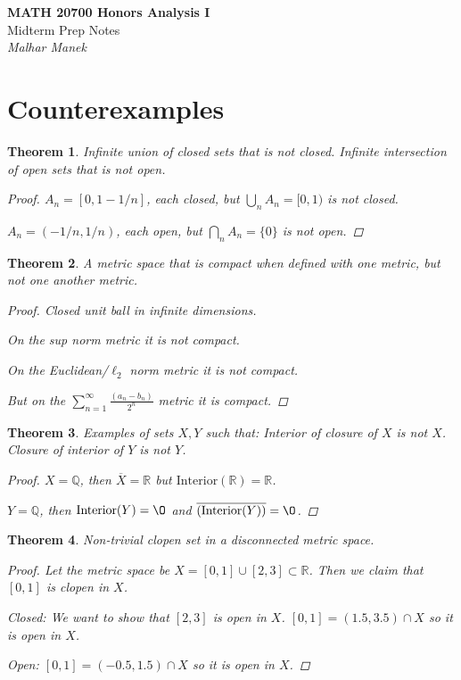\documentclass[11pt]{article}
\newcommand{\bbQ}{\mathbb{Q}}
\newcommand{\bbR}{\mathbb{R}}
\renewcommand{\emptyset}{\O}
\renewcommand{\_}[1]{\underline{ #1 }}
\newtheorem{theorem}{Theorem}[section]
\theoremstyle{definition}
\numberwithin{equation}{subsection}
\begin{document}
\begin{center}
    {\LARGE\bfseries MATH 20700 Honors Analysis I}\\[6pt]
    {\Large Midterm Prep Notes}\\[6pt]
    {\Large\itshape Malhar Manek}
\end{center}

\bigskip

\section*{Counterexamples}
\begin{theorem}
    Infinite union of closed sets that is not closed. Infinite intersection of open sets that is not open. 
    \begin{proof}
        $A_n = [0, 1 - 1/n]$, each closed, but $\bigcup_n A_n = [0,1)$ is not closed.

        $A_n = (-1/n, 1/n)$, each open, but $\bigcap_n A_n = \{0\}$ is not open.
    \end{proof}
\end{theorem}

\begin{theorem}
    A metric space that is compact when defined with one metric, but not one another metric.
    \begin{proof}
        Closed unit ball in infinite dimensions. 

        On the sup norm metric it is not compact.

        On the Euclidean/$\ell_2$ norm metric it is not compact.

        But on the $\sum_{n=1}^\infty \frac{(a_n-b_n)}{2^n}$ metric it is compact.
    \end{proof}
\end{theorem}

\begin{theorem}
    Examples of sets $X,Y$ such that: Interior of closure of $X$ is not $X$. Closure of interior of $Y$ is not $Y$.
    \begin{proof}
        $X=\bbQ$, then $\overline{X}=\bbR$ but $\text{Interior} (\bbR) = \bbR$.

        $Y = \bbQ$, then $\text{Interior}(Y)=\emptyset$ and $\overline{(\text{Interior}(Y))}=\emptyset$.
    \end{proof}
\end{theorem}

\begin{theorem}
    Non-trivial clopen set in a disconnected metric space.
\begin{proof}
Let the metric space be $X = [0,1]\cup [2,3] \subset \bbR$. Then we claim that $[0,1]$ is clopen in $X$.

Closed: We want to show that $[2,3]$ is open in $X$. $[0,1] = (1.5,3.5) \cap X$ so it is open in $X$.

Open: $[0,1] = (-0.5, 1.5) \cap X$ so it is open in $X$. 
\end{proof}
\end{theorem}
\end{document}
